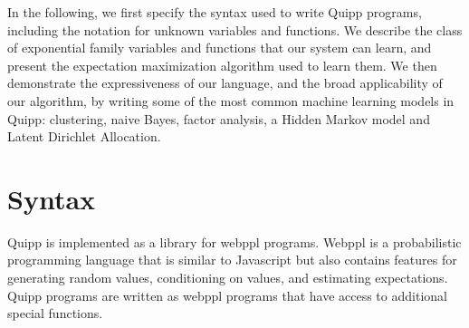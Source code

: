\documentclass{article}
\begin{document}




  In the following, we first specify the syntax used to write Quipp programs,
  including the notation for unknown variables and functions.
  We describe the class of exponential family variables and functions that our system can learn,
  and present the expectation maximization algorithm used to learn them.
  We then demonstrate the expressiveness of our language, and the broad
  applicability of our algorithm, by writing some of the most common machine learning models
  in Quipp: clustering, naive Bayes, factor analysis, a Hidden Markov model and Latent Dirichlet Allocation.
  
  \section{Syntax}

  Quipp is implemented as a library for webppl programs.  Webppl \cite{dippl} is a probabilistic programming language
  that is similar to Javascript but also contains features for generating random values, conditioning on values,
  and estimating expectations. Quipp programs are written as webppl programs that have access to additional special functions.
\end{document}
